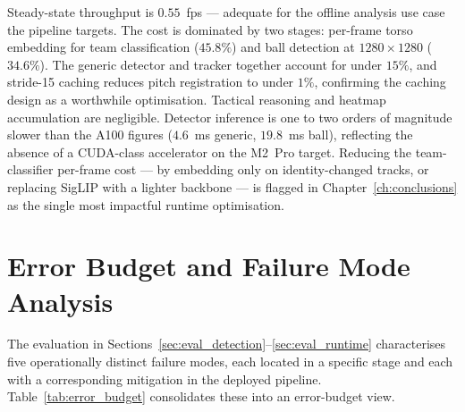 Steady-state throughput is $0.55$~fps --- adequate for the offline
analysis use case the pipeline targets. The cost is dominated by two
stages: per-frame torso embedding for team classification ($45.8\%$)
and ball detection at $1280\!\times\!1280$ ($34.6\%$). The generic
detector and tracker together account for under $15\%$, and stride-15
caching reduces pitch registration to under $1\%$, confirming the
caching design as a worthwhile optimisation. Tactical reasoning and heatmap accumulation are negligible. Detector inference is
one to two orders of magnitude slower than the A100 figures ($4.6$~ms generic, $19.8$~ms ball),
reflecting the absence of a CUDA-class accelerator on the M2~Pro
target. Reducing the team-classifier per-frame cost --- by embedding
only on identity-changed tracks, or replacing SigLIP with a lighter
backbone --- is flagged in Chapter~\ref{ch:conclusions} as the single
most impactful runtime optimisation.

\section{Error Budget and Failure Mode Analysis}
\label{sec:eval_failures}

The evaluation in Sections~\ref{sec:eval_detection}--\ref{sec:eval_runtime}
characterises five operationally distinct failure modes, each
located in a specific stage and each with a corresponding
mitigation in the deployed pipeline.
Table~\ref{tab:error_budget} consolidates these into an
error-budget view.

